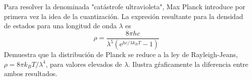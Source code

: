 \documentclass[addpoints,spanish, 12pt,a4paper]{exam}
\author{David De Sancho}
\begin{document}


\begin{center}
    \gradetable[h][questions]
\end{center}
\vspace{0.1in} %


\begin{questions} %

    \question[1] Para resolver la denominada "catástrofe
    ultravioleta", Max Planck introduce por primera vez 
    la idea de la cuantización. La expresión resultante
    para la densidad de estados para una longitud de onda
    $\lambda$ es  
    \begin{equation*}
        \rho=\frac{8\pi hc}{\lambda^5(\mathrm{e}^{hc/\lambda k_BT}-1)}\
    \end{equation*}
    Demuestra que la distribución de Planck se reduce 
    a la ley de Rayleigh-Jeans, 
    $\rho=8\pi k_BT/\lambda^4$, 
    para valores elevados de $\lambda$. Ilustra gŕaficamente
    la diferencia entre ambos resultados.
    \newpage
%
    

\end{questions}
\end{document}
